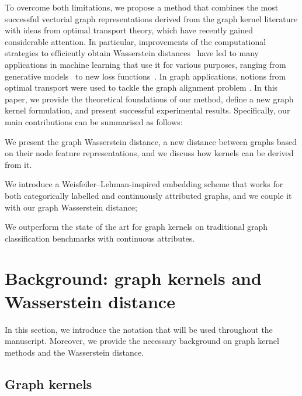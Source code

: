 \documentclass{article}
\begin{document}
To overcome both limitations, we propose a method that combines the most successful vectorial graph representations derived from the graph kernel literature with ideas from optimal transport theory, which have recently gained considerable attention. 
In particular, improvements of the computational strategies to efficiently obtain Wasserstein distances~\citep{cuturi2013sinkhorn, altschuler2017near} have led to many applications in machine learning that use it for various purposes, ranging from generative models~\citep{arjovsky2017wasserstein} to new loss functions~\citep{frogner2015learning}. 
In graph applications, notions from optimal transport were used to tackle the graph alignment problem \citep{xu2019gromov}.
In this paper, we provide the theoretical foundations of our method, define a new graph kernel formulation, and present successful experimental results. Specifically, our main contributions can be summarised as follows:
\begin{compactitem}
    \item We present the graph Wasserstein distance, a new distance between graphs based on their node feature representations, and we discuss how kernels can be derived from it.
    \item We introduce a Weisfeiler--Lehman-inspired embedding scheme that works for both categorically labelled and continuously attributed graphs, and we couple it with our graph Wasserstein distance;
    \item We outperform the state of the art for graph kernels on traditional graph classification benchmarks with continuous attributes.
\end{compactitem}



\section{Background: graph kernels and Wasserstein distance}
\label{sec:background}

In this section, we introduce the notation that will be used throughout the manuscript. Moreover, we provide the necessary background on graph kernel methods and the Wasserstein distance. 


\subsection{Graph kernels}
\end{document}
